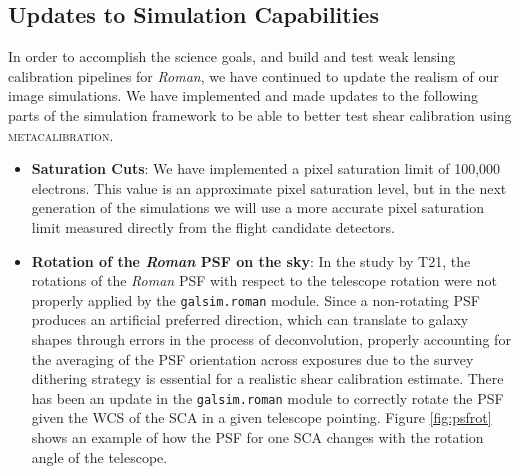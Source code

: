 \documentclass[fleqn,usenatbib]{mnras}
\begin{document}
\subsection{Updates to Simulation Capabilities}
\label{subsec:updates}
In order to accomplish the science goals, and build and test weak lensing calibration pipelines for \emph{Roman}, we have continued to update the realism of our image simulations. We have implemented and made updates to the following parts of the simulation framework to be able to better test shear calibration using \textsc{metacalibration}. 
\begin{itemize}
    \setlength\itemsep{1em}
    \item \textbf{Saturation Cuts}:
    We have implemented a pixel saturation limit of 100,000 electrons. This value is an approximate pixel saturation level, but in the next generation of the simulations we will use a more accurate pixel saturation limit measured directly from the flight candidate detectors. 
    
    \item \textbf{Rotation of the \emph{Roman} PSF on the sky}:
    In the study by T21, the rotations of the \emph{Roman} PSF with respect to the telescope rotation were not properly applied by the \texttt{galsim.roman} module. Since a non-rotating PSF produces an artificial preferred direction, which can translate to galaxy shapes through errors in the process of deconvolution, properly accounting for the averaging of the PSF orientation across exposures due to the survey dithering strategy is essential for a realistic shear calibration estimate. There has been an update in the \texttt{galsim.roman} module to correctly rotate the PSF given the WCS of the SCA in a given telescope pointing. Figure \ref{fig:psfrot} shows an example of how the PSF for one SCA changes with the rotation angle of the telescope.
    

\end{itemize}
\end{document}
